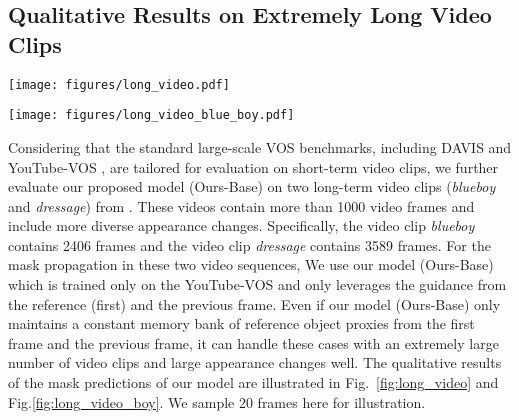 \documentclass[sigconf]{acmart}
\begin{document}
\subsection{Qualitative Results on Extremely Long Video Clips}
\begin{figure*}[t]
	\centering
	\texttt{[image: figures/long\_video.pdf]}
\caption{We show a long-video case (\textit{dressage}) of \textit{a man riding a horse} with 3589 frames from \cite{liang2020video} and we sample 20 frames overtime here for illustration. The first frame with its mask (in the top left corner) is given as the reference for mask propagation, the propagated masks along the time are arranged from left to right and from top to bottom. Even if our model (Ours-Base) only leverages the guidance from the first and the previous frame, it can handle such cases with an extremely large number of video clips and large appearance changes well. Please zoom in on the figure to view it better.}
	\label{fig:long_video}
\end{figure*} \begin{figure*}[t]
	\centering
	\texttt{[image: figures/long\_video\_blue\_boy.pdf]}
\caption{We show a long-video case (\textit{blueboy}) of \textit{a man in a blue shirt who does a lot of actions} with 2406 frames from \cite{liang2020video} and we sample 20 frames over time for illustration. The first frame with its mask (in the top left corner) is given as the reference for mask propagation, the propagated masks along the time are arranged from left to right and from top to bottom. Even if our model (Ours-Base) only leverages the guidance from the first and the previous frame, it can handle such cases with an extremely large number of video clips and large appearance changes well. Please zoom in on the figure to view it better.}
	\label{fig:long_video_boy}
\end{figure*} Considering that the standard large-scale VOS benchmarks, including DAVIS \cite{perazzi2016benchmark} and YouTube-VOS \cite{xu2018youtube}, are tailored for evaluation on short-term video clips, we further evaluate our proposed model (Ours-Base) on two long-term video clips (\textit{blueboy} and \textit{dressage}) from \cite{liang2020video}. These videos contain more than 1000 video frames and include more diverse appearance changes. Specifically, the video clip \textit{blueboy} contains 2406 frames and the video clip \textit{dressage} contains 3589 frames. For the mask propagation in these two video sequences, We use our model (Ours-Base) which is trained only on the YouTube-VOS \cite{xu2018youtube} and only leverages the guidance from the reference (first) and the previous frame. 
Even if our model (Ours-Base) only maintains a constant memory bank of reference object proxies from the first frame and the previous frame, it can handle these cases with an extremely large number of video clips and large appearance changes well. The qualitative results of the mask predictions of our model are illustrated in Fig.~\ref{fig:long_video} and Fig.\ref{fig:long_video_boy}. We sample 20 frames here for illustration.
\end{document}
